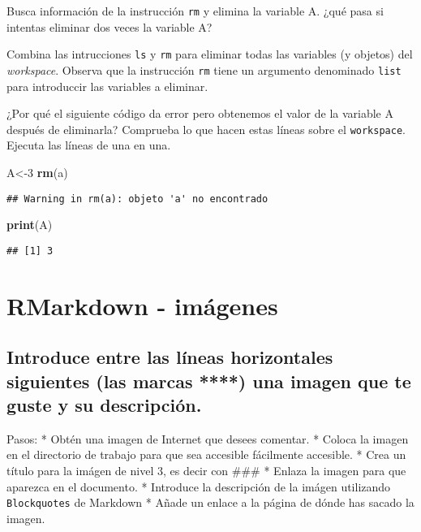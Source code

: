 \documentclass[
]{article}
\newenvironment{Shaded}{\begin{snugshade}}{\end{snugshade}}
\newcommand{\DecValTok}[1]{\textcolor[rgb]{0.00,0.00,0.81}{#1}}
\newcommand{\KeywordTok}[1]{\textcolor[rgb]{0.13,0.29,0.53}{\textbf{#1}}}
\newcommand{\NormalTok}[1]{#1}
\begin{document}
Busca información de la instrucción \texttt{rm} y elimina la variable A.
¿qué pasa si intentas eliminar dos veces la variable A?

Combina las intrucciones \texttt{ls} y \texttt{rm} para eliminar todas
las variables (y objetos) del \emph{workspace}. Observa que la
instrucción \texttt{rm} tiene un argumento denominado \texttt{list} para
introduccir las variables a eliminar.

¿Por qué el siguiente código da error pero obtenemos el valor de la
variable A después de eliminarla? Comprueba lo que hacen estas líneas
sobre el \texttt{workspace}. Ejecuta las líneas de una en una.

\begin{Shaded}
\begin{Highlighting}[]
\NormalTok{A<-}\DecValTok{3}
\KeywordTok{rm}\NormalTok{(a)}
\end{Highlighting}
\end{Shaded}

\begin{verbatim}
## Warning in rm(a): objeto 'a' no encontrado
\end{verbatim}

\begin{Shaded}
\begin{Highlighting}[]
\KeywordTok{print}\NormalTok{(A)}
\end{Highlighting}
\end{Shaded}

\begin{verbatim}
## [1] 3
\end{verbatim}

\hypertarget{rmarkdown---imuxe1genes}{%
\section{RMarkdown - imágenes}\label{rmarkdown---imuxe1genes}}

\hypertarget{introduce-entre-las-luxedneas-horizontales-siguientes-las-marcas-una-imagen-que-te-guste-y-su-descripciuxf3n.}{%
\subsection{Introduce entre las líneas horizontales siguientes (las
marcas ****) una imagen que te guste y su
descripción.}\label{introduce-entre-las-luxedneas-horizontales-siguientes-las-marcas-una-imagen-que-te-guste-y-su-descripciuxf3n.}}

Pasos: * Obtén una imagen de Internet que desees comentar. * Coloca la
imagen en el directorio de trabajo para que sea accesible fácilmente
accesible. * Crea un título para la imágen de nivel 3, es decir con
\#\#\# * Enlaza la imagen para que aparezca en el documento. * Introduce
la descripción de la imágen utilizando \texttt{Blockquotes} de Markdown
* Añade un enlace a la página de dónde has sacado la imagen.
\end{document}
